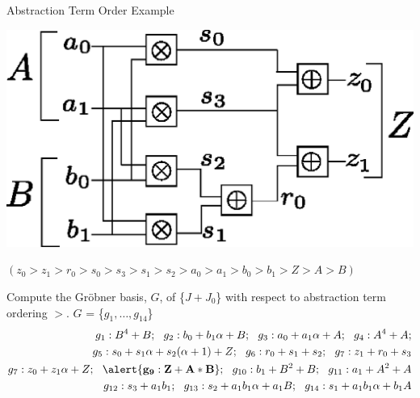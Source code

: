 \documentclass[xcolor=dvipsnames]{beamer}
\newcommand{\Grobner}{Gr\"{o}bner\xspace}
\begin{document}
\begin{frame}{\large{Abstraction Term Order Example}}

\centerline{
\includegraphics[scale=0.4]{2bitmult.eps}
}
{\bf $(z_0 > z_1 > r_0 > s_0 > s_3 > s_1 > s_2 > a_0 > a_1 >  b_0 > b_1 > Z > A > B)$}

Compute the \Grobner basis, $G$, of \{$J + J_0$\} with respect to abstraction term ordering $>$.
$G$ = \{$g_1, \dots, g_{14}$\}
\begin{align*}
g_1: B^4+B; ~~g_2: b_0+b_1 \alpha + B; ~~g_3: a_0+a_1 \alpha + A; ~~g_4: A^4+A; \nonumber \\
g_5: s_0+s_1 \alpha + s_2 (\alpha + 1) + Z; ~~g_6: r_0+s_1+s_2; ~~g_7: z_1+r_0+s_3 \nonumber \\
g_7: z_0+z_1 \alpha +Z; ~~\alert{\bf g_9: Z+A*B} ; ~~g_{10}: b_1+B^2+B; ~~g_{11}: a_1+A^2+A \nonumber \\
g_{12}: s_3+a_1 b_1; ~~g_{13}: s_2+a_1 b_1 \alpha +a_1 B; ~~g_{14}: s_1+a_1 b_1 \alpha +b_1 A  \nonumber
\end{align*}

\end{frame}

\end{document}
